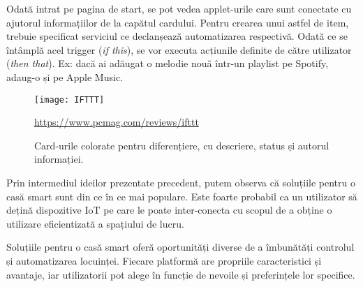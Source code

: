 Odată intrat pe pagina de start, se pot vedea applet-urile care sunt conectate cu ajutorul informațiilor de la capătul cardului. Pentru crearea unui astfel de item, trebuie specificat serviciul ce declanșează automatizarea respectivă. Odată ce se întâmplă acel trigger (\emph{if this}), se vor executa acțiunile definite de către utilizator (\emph{then that}). Ex: dacă ai adăugat o melodie nouă într-un playlist pe Spotify, adaug-o și pe Apple Music.


\begin{figure}[h]
	\centering
	\texttt{[image: IFTTT]}
	\caption{Card-urile colorate pentru diferențiere, cu descriere, status și autorul informației.}\url{https://www.pcmag.com/reviews/ifttt}
	\label{fig:ifttt}
\end{figure}

\break
\hfill

\hfill

Prin intermediul ideilor prezentate precedent, putem observa că soluțiile pentru o casă smart sunt din ce în ce mai populare. Este foarte probabil ca un utilizator să dețină dispozitive IoT pe care le poate inter-conecta cu scopul de a obține o utilizare eficientizată a spațiului de lucru.

Soluțiile pentru o casă smart oferă oportunități diverse de a îmbunătăți controlul și automatizarea locuinței. Fiecare platformă are propriile caracteristici și avantaje, iar utilizatorii pot alege în funcție de nevoile și preferințele lor specifice.